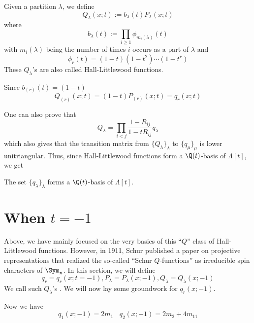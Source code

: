 \documentclass[11pt,leqno,oneside]{amsart}
\numberwithin{thm}{section}
\newcommand{\sym}{\Lambda}
\begin{document}
\begin{defn}\label{def-Q}
  Given a partition \(\lambda\), we define \[
    Q_\lambda(x;t) := b_\lambda(t) P_\lambda(x;t)
  \]
  where \[
    b_\lambda(t) := \prod_{i \geq 1} \phi_{m_i(\lambda)}(t)
  \]
  with \(m_i(\lambda)\) being the number of times \(i\) occurs as a
  part of \(\lambda\) and \[
    \phi_r(t) = (1-t)(1-t^2) \cdots (1-t^r)
  \]
  These \(Q_\lambda\)'s are also called Hall-Littlewood functions.
\end{defn}
\begin{prop}
  Since \(b_{(r)}(t) = (1-t)\)
  \[
    Q_{(r)}(x;t) = (1-t)P_{(r)}(x;t) = q_r(x;t)
  \]
\end{prop}
One can also prove that \[
  Q_\lambda = \prod_{i < j} \frac{1-R_{ij}}{1-t R_{ij}} q_\lambda
\]
which also gives that the transition matrix from
\(\{Q_\lambda\}_{\lambda}\)  to \(\{q_\mu\}_\mu\) is lower
unitriangular. Thus, since Hall-Littlewood functions form a
\(\Q(t)\)-basis of \(\sym[t]\), we get
\begin{prop}
 The set \(\{q_\lambda\}_\lambda\) forms a \(\Q(t)\)-basis of \(\sym[t]\).
\end{prop}
\section{When \(t=-1\)}
Above, we have mainly focused on the very basics of this ``\(Q\)''
class of Hall-Littlewood functions. However, in
1911, Schur published a paper on projective representations that
realized the so-called ``Schur \(Q\)-functions'' as irreducible spin
characters of \(\Sym_n\). In this section, we will define \[
  q_r = q_r(x;t=-1), P_\lambda = P_\lambda(x;-1), Q_\lambda =
  Q_\lambda(x;-1) 
\]
We call such \(Q_\lambda\)'s . We will now
lay some groundwork for \(q_r(x;-1)\). 
\begin{example}
  Now we have \[
    q_1(x;-1) = 2 m_1 \ \ \ \ q_2(x;-1) = 2 m_2 + 4 m_{11}
  \]
\end{example}
\end{document}
